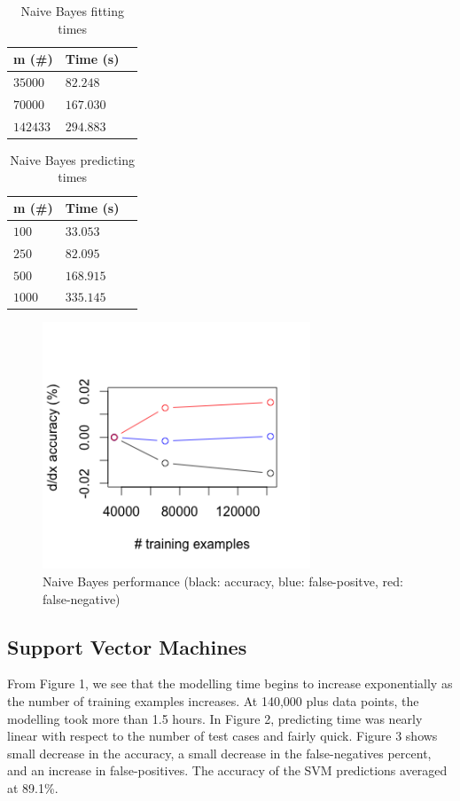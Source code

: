 \documentclass[twoside]{article}
\begin{document}
\begin{multicols}{2}
\begin{table}[H]
\caption{Naive Bayes fitting times}
\centering
\begin{tabular}{llr}
\toprule
m (\#) & Time (s) \\
\midrule
$35000$ & $82.248$ \\
$70000$ & $167.030$ \\
$142433$ & $294.883$ \\
\bottomrule
\end{tabular}
\end{table}

\begin{table}[H]
\caption{Naive Bayes predicting times}
\centering
\begin{tabular}{llr}
\toprule
m (\#) & Time (s) \\
\midrule
$100$ & $33.053$ \\
$250$ & $82.095$ \\
$500$ & $168.915$ \\
$1000$ & $335.145$ \\
\bottomrule
\end{tabular}
\end{table}

\begin{figure}[H]
 \caption{Naive Bayes performance (black: accuracy, blue: false-positve, red: false-negative)}
  \centering
    \includegraphics[width=8cm]{../data/nb_acc}
\end{figure}

\subsection{Support Vector Machines}
From Figure 1, we see that the modelling time begins to increase exponentially as the number of training examples increases. At 140,000 plus data points, the modelling took more than 1.5 hours. In Figure 2, predicting time was nearly linear with respect to the number of test cases and fairly quick. Figure 3 shows small decrease in the accuracy, a small decrease in the false-negatives percent, and an increase in false-positives. The accuracy of the SVM predictions averaged at 89.1\%.


\end{multicols}
\end{document}
